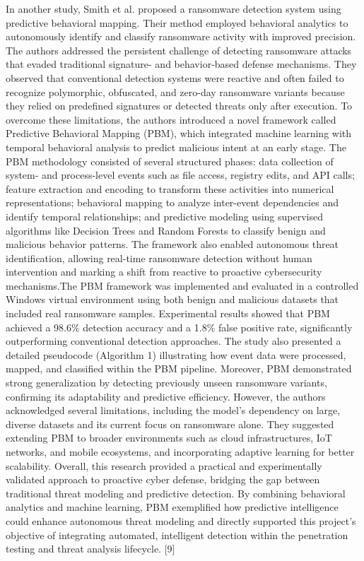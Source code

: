 \documentclass[12pt,a4paper]{report}
\begin{document}
In another study, Smith et al. proposed a ransomware detection system using predictive behavioral mapping. Their method employed behavioral analytics to autonomously identify and classify ransomware activity with improved precision. The authors addressed the persistent challenge of detecting ransomware attacks that evaded traditional signature- and behavior-based defense mechanisms. They observed that conventional detection systems were reactive and often failed to recognize polymorphic, obfuscated, and zero-day ransomware variants because they relied on predefined signatures or detected threats only after execution. To overcome these limitations, the authors introduced a novel framework called Predictive Behavioral Mapping (PBM), which integrated machine learning with temporal behavioral analysis to predict malicious intent at an early stage. The PBM methodology consisted of several structured phases: data collection of system- and process-level events such as file access, registry edits, and API calls; feature extraction and encoding to transform these activities into numerical representations; behavioral mapping to analyze inter-event dependencies and identify temporal relationships; and predictive modeling using supervised algorithms like Decision Trees and Random Forests to classify benign and malicious behavior patterns. The framework also enabled autonomous threat identification, allowing real-time ransomware detection without human intervention and marking a shift from reactive to proactive cybersecurity mechanisms.The PBM framework was implemented and evaluated in a controlled Windows virtual environment using both benign and malicious datasets that included real ransomware samples. Experimental results showed that PBM achieved a 98.6\% detection accuracy and a 1.8\% false positive rate, significantly outperforming conventional detection approaches. The study also presented a detailed pseudocode (Algorithm 1) illustrating how event data were processed, mapped, and classified within the PBM pipeline. Moreover, PBM demonstrated strong generalization by detecting previously unseen ransomware variants, confirming its adaptability and predictive efficiency. However, the authors acknowledged several limitations, including the model’s dependency on large, diverse datasets and its current focus on ransomware alone. They suggested extending PBM to broader environments such as cloud infrastructures, IoT networks, and mobile ecosystems, and incorporating adaptive learning for better scalability. Overall, this research provided a practical and experimentally validated approach to proactive cyber defense, bridging the gap between traditional threat modeling and predictive detection. By combining behavioral analytics and machine learning, PBM exemplified how predictive intelligence could enhance autonomous threat modeling and directly supported this project’s objective of integrating automated, intelligent detection within the penetration testing and threat analysis lifecycle. [9]
\end{document}
